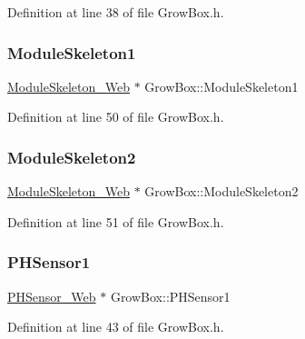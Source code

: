 Definition at line 38 of file Grow\+Box.\+h.

\mbox{\label{class_grow_box_a86e43adbb636d95597cea22666ca87e2}} 
\subsubsection{\texorpdfstring{Module\+Skeleton1}{ModuleSkeleton1}}
{\footnotesize\ttfamily \hyperlink{class_module_skeleton___web}{Module\+Skeleton\+\_\+\+Web} $\ast$ Grow\+Box\+::\+Module\+Skeleton1}



Definition at line 50 of file Grow\+Box.\+h.

\mbox{\label{class_grow_box_af2699e6867ce4f138e7ae2139b079b20}} 
\subsubsection{\texorpdfstring{Module\+Skeleton2}{ModuleSkeleton2}}
{\footnotesize\ttfamily \hyperlink{class_module_skeleton___web}{Module\+Skeleton\+\_\+\+Web} $\ast$ Grow\+Box\+::\+Module\+Skeleton2}



Definition at line 51 of file Grow\+Box.\+h.

\mbox{\label{class_grow_box_a5a05648cf4487f017f282b1e66a19828}} 
\subsubsection{\texorpdfstring{P\+H\+Sensor1}{PHSensor1}}
{\footnotesize\ttfamily \hyperlink{class_p_h_sensor___web}{P\+H\+Sensor\+\_\+\+Web} $\ast$ Grow\+Box\+::\+P\+H\+Sensor1}



Definition at line 43 of file Grow\+Box.\+h.

\mbox{\label{class_grow_box_a3b1da631cb857ddfcbe6ecbbd6bb643a}} 
